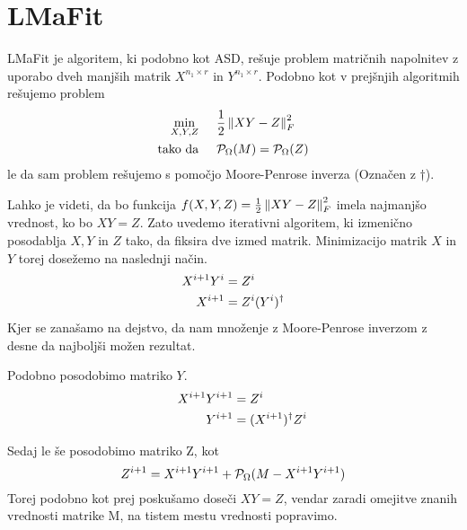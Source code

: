 \section{LMaFit}
LMaFit je algoritem, ki podobno kot ASD, rešuje problem matričnih napolnitev z uporabo dveh manjših matrik $X^{n_1 \times r}$ in $Y^{n_1 \times r}$. Podobno kot v prejšnjih algoritmih rešujemo problem 
\begin{align*}
    \min_{X, Y, Z}& \hspace{0.5cm} \frac{1}{2}\left\lVert XY - Z\right\rVert_F^2\\
    \text{tako da}& \hspace{0.5cm} \mathcal{P}_\Omega(M) = \mathcal{P}_\Omega(Z)
\end{align*}
le da sam problem rešujemo s pomočjo Moore-Penrose inverza (Označen z $\dagger$).

Lahko je videti, da bo funkcija $f(X,Y,Z) = \frac{1}{2}\left\lVert XY - Z\right\rVert_F^2$ imela najmanjšo vrednost, ko bo $XY = Z$. Zato uvedemo iterativni algoritem, ki izmenično posodablja $X, Y$ in $Z$ tako, da fiksira dve izmed matrik. Minimizacijo matrik $X$ in $Y$ torej dosežemo na naslednji način.
\begin{align*}
    X^{i+1}Y^{i} &= Z^{i} \hspace{0.5cm} \\
    X^{i+1} &= Z^{i}(Y^i)^\dagger
\end{align*}
Kjer se zanašamo na dejstvo, da nam množenje z Moore-Penrose inverzom z desne 
da najboljši možen rezultat.

Podobno posodobimo matriko $Y$.
\begin{align*}
    \hspace{0.5cm} X^{i+1}Y^{i+1} &= Z^{i}   \\
    Y^{i+1} &= (X^{i+1})^\dagger Z^{i}
\end{align*}

Sedaj le še posodobimo matriko Z, kot
\[
    Z^{i+1} = X^{i+1}Y^{i+1} + \mathcal{P}_\Omega(M - X^{i+1}Y^{i+1})
\]
Torej podobno kot prej poskušamo doseči $XY = Z$, vendar zaradi omejitve znanih vrednosti matrike M, na tistem mestu vrednosti popravimo. \cite{LMaFit-WY12}
